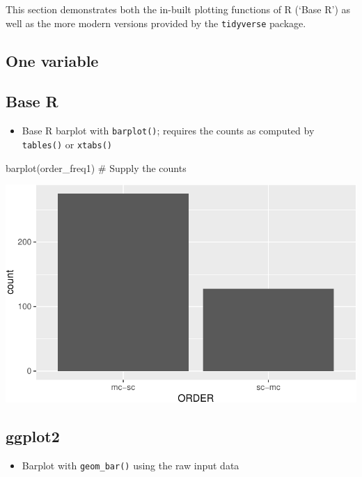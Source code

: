 \documentclass[
  11pt,
  letterpaper,
  DIV=11,
  numbers=noendperiod]{scrreprt}
\newenvironment{Shaded}{\begin{snugshade}}{\end{snugshade}}
\newcommand{\CommentTok}[1]{\textcolor[rgb]{0.37,0.37,0.37}{#1}}
\newcommand{\FunctionTok}[1]{\textcolor[rgb]{0.28,0.35,0.67}{#1}}
\newcommand{\NormalTok}[1]{\textcolor[rgb]{0.00,0.23,0.31}{#1}}
\providecommand{\tightlist}{%
  \setlength{\itemsep}{0pt}\setlength{\parskip}{0pt}}\usepackage{longtable,booktabs,array}
\begin{document}
This section demonstrates both the in-built plotting functions of R
(`Base R') as well as the more modern versions provided by the
\texttt{tidyverse} package.

\subsection{One variable}\label{one-variable-1}

\subsection{Base R}

\begin{itemize}
\tightlist
\item
  Base R barplot with \texttt{barplot()}; requires the counts as
  computed by \texttt{tables()} or \texttt{xtabs()}
\end{itemize}

\begin{Shaded}
\begin{Highlighting}[]
\FunctionTok{barplot}\NormalTok{(order\_freq1) }\CommentTok{\# Supply the counts}
\end{Highlighting}
\end{Shaded}

\includegraphics{Categorical_data_files/figure-pdf/unnamed-chunk-10-1.pdf}

\subsection{ggplot2}

\begin{itemize}
\tightlist
\item
  Barplot with \texttt{geom\_bar()} using the raw input data
\end{itemize}
\end{document}
